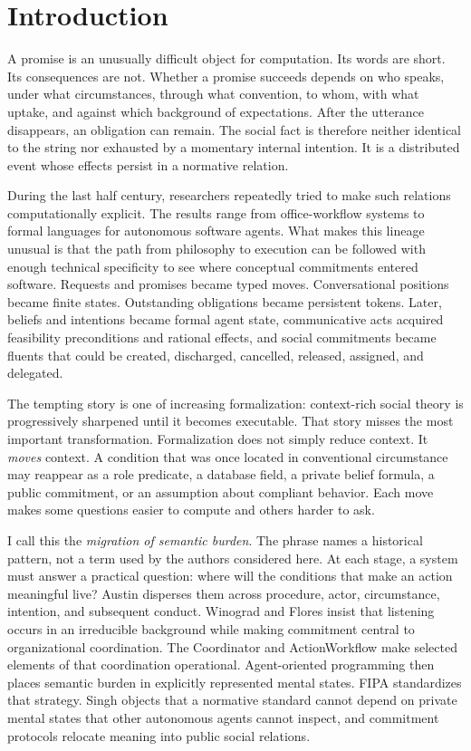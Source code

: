 \documentclass[11pt]{article}
\begin{document}
\section{Introduction}
A promise is an unusually difficult object for computation. Its words are short. Its consequences are not. Whether a promise succeeds depends on who speaks, under what circumstances, through what convention, to whom, with what uptake, and against which background of expectations. After the utterance disappears, an obligation can remain. The social fact is therefore neither identical to the string nor exhausted by a momentary internal intention. It is a distributed event whose effects persist in a normative relation.

During the last half century, researchers repeatedly tried to make such relations computationally explicit. The results range from office-workflow systems to formal languages for autonomous software agents. What makes this lineage unusual is that the path from philosophy to execution can be followed with enough technical specificity to see where conceptual commitments entered software. Requests and promises became typed moves. Conversational positions became finite states. Outstanding obligations became persistent tokens. Later, beliefs and intentions became formal agent state, communicative acts acquired feasibility preconditions and rational effects, and social commitments became fluents that could be created, discharged, cancelled, released, assigned, and delegated. \cite{austin1962things,winogradflores1986understanding,shoham1993aop,fipa2002cal,yolumsingh2002flexible}

The tempting story is one of increasing formalization: context-rich social theory is progressively sharpened until it becomes executable. That story misses the most important transformation. Formalization does not simply reduce context. It \emph{moves} context. A condition that was once located in conventional circumstance may reappear as a role predicate, a database field, a private belief formula, a public commitment, or an assumption about compliant behavior. Each move makes some questions easier to compute and others harder to ask.

I call this the \emph{migration of semantic burden}. The phrase names a historical pattern, not a term used by the authors considered here. At each stage, a system must answer a practical question: where will the conditions that make an action meaningful live? Austin disperses them across procedure, actor, circumstance, intention, and subsequent conduct. Winograd and Flores insist that listening occurs in an irreducible background while making commitment central to organizational coordination. The Coordinator and ActionWorkflow make selected elements of that coordination operational. Agent-oriented programming then places semantic burden in explicitly represented mental states. FIPA standardizes that strategy. Singh objects that a normative standard cannot depend on private mental states that other autonomous agents cannot inspect, and commitment protocols relocate meaning into public social relations. \cite{austin1962things,winogradflores1986understanding,medinamora1992actionworkflow,flores1993conversation,singh1998rethinking,yolumsingh2002flexible}
\end{document}

